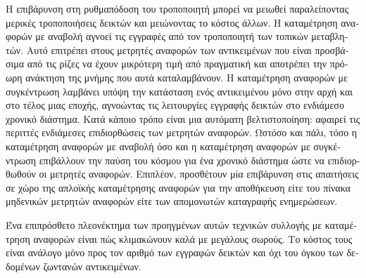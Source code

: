 \begin{greek}
Η επιβάρυνση στη ρυθμαπόδοση του τροποποιητή μπορεί να
μειωθεί παραλείποντας μερικές τροποποιήσεις δεικτών και
μειώνοντας το κόστος άλλων. Η καταμέτρηση αναφορών με
αναβολή αγνοεί τις εγγραφές από τον τροποποιητή των τοπικών
μεταβλητών. Αυτό επιτρέπει στους μετρητές αναφορών των
αντικειμένων που είναι προσβάσιμα από τις ρίζες να έχουν
μικρότερη τιμή από πραγματική και αποτρέπει την πρόωρη
ανάκτηση της μνήμης που αυτά καταλαμβάνουν. Η καταμέτρηση
αναφορών με συγκέντρωση λαμβάνει υπόψη την κατάσταση ενός
αντικειμένου μόνο στην αρχή και στο τέλος μιας εποχής,
αγνοώντας τις λειτουργίες εγγραφής δεικτών στο ενδιάμεσο
χρονικό διάστημα. Κατά κάποιο τρόπο είναι μια αυτόματη
βελτιστοποίηση: αφαιρεί τις περιττές ενδιάμεσες
επιδιορθώσεις των μετρητών αναφορών. Ωστόσο και πάλι,
τόσο η καταμέτρηση αναφορών με αναβολή όσο και η καταμέτρηση
αναφορών με συγκέντρωση επιβάλλουν την παύση του κόσμου
για ένα χρονικό διάστημα ώστε να επιδιορθωθούν οι μετρητές
αναφορών. Επιπλέον, προσθέτουν μία επιβάρυνση στις
απαιτήσεις σε χώρο της απλοϊκής καταμέτρησης αναφορών
για την αποθήκευση είτε του πίνακα μηδενικών μετρητών
αναφορών είτε των απομονωτών καταγραφής ενημερώσεων.

Ένα επιπρόσθετο πλεονέκτημα των προηγμένων αυτών τεχνικών
συλλογής με καταμέτρηση αναφορών είναι πώς κλιμακώνουν
καλά με μεγάλους σωρούς. Το κόστος τους είναι ανάλογο
μόνο προς τον αριθμό των εγγραφών δεικτών και όχι του
όγκου των δεδομένων ζωντανών αντικειμένων.

\end{greek}
